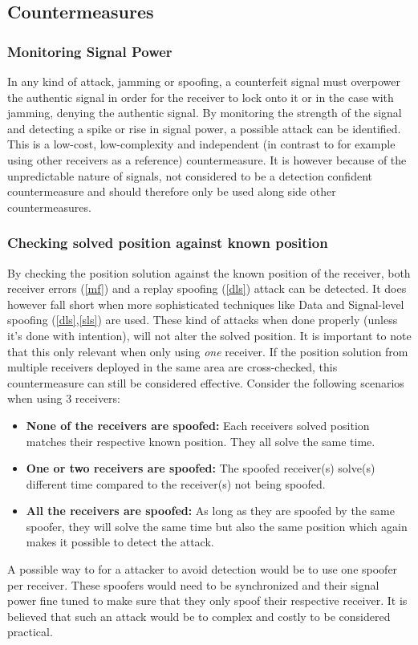 \documentclass[12pt,english,a4paper]{article}
\begin{document}
\subsection{Countermeasures}
\subsubsection{Monitoring Signal Power}\label{msp} %
In any kind of attack, jamming or spoofing, a counterfeit signal must overpower the authentic signal in order for the receiver to lock onto it or in the case with jamming, denying the authentic signal. By monitoring the strength of the signal and detecting a spike or rise in signal power, a possible attack can be identified. This is a low-cost, low-complexity and independent (in contrast to for example using other receivers as a reference) countermeasure. It is however because of the unpredictable nature of signals, not considered to be a detection confident countermeasure and should therefore only be used along side other countermeasures.\cite{HengChouGao14}

\subsubsection{Checking solved position against known position}\label{cspakp} %
By checking the position solution against the known position of the receiver, both receiver errors (\ref{mf}) and a replay spoofing (\ref{dls}) attack can be detected. It does however fall short when more sophisticated techniques like Data and Signal-level spoofing (\ref{dls},\ref{sls}) are used. These kind of attacks when done properly (unless it's done with intention), will not alter the solved position. It is important to note that this only relevant when only using \textit{one} receiver. If the position solution from multiple receivers deployed in the same area are cross-checked, this countermeasure can still be considered effective. Consider the following scenarios when using 3 receivers:
\begin{itemize}
  \item \textbf{None of the receivers are spoofed:} Each receivers solved position matches their respective known position. They all solve the same time. 
  \item \textbf{One or two receivers are spoofed:} The spoofed receiver(s) solve(s) different time compared to the receiver(s) not being spoofed.
  \item \textbf{All the receivers are spoofed:} As long as they are spoofed by the same spoofer, they will solve the same time but also the same position which again makes it possible to detect the attack.
\end{itemize}
A possible way to for a attacker to avoid detection would be to use one spoofer per receiver. These spoofers would need to be synchronized and their signal power fine tuned to make sure that they only spoof their respective receiver. It is believed that such an attack would be to complex and costly to be considered practical. \cite{HengChouGao14}
\end{document}
